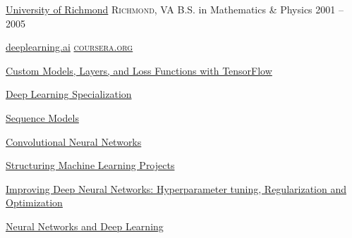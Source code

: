 \documentclass[10pt,a4paper]{article}
\begin{document}
\headedsection
  {\href{http://www.richmond.edu/}{University of Richmond}}
  {\textsc{Richmond, VA}} {%
  \headedsubsection
    {B.S. in Mathematics \& Physics}
    {2001 -- 2005}
    {}
}


\spacedhrule{2.0em}{0.2em}



  \headedsection
    {\href{https://www.deeplearning.ai/}{deeplearning.ai}}
    {\href{https://www.coursera.org/}{\textsc{coursera.org}}} {

      \headedsubsection
        {\href{https://www.coursera.org/account/accomplishments/verify/TWG6QF3MVDHG}{Custom Models, Layers, and Loss Functions with TensorFlow}}
        {}

      \headedsubsection
        {\href{https://www.coursera.org/account/accomplishments/specialization/9WCEB5PYL6VT}{Deep Learning Specialization}}
        {}

      \headedsubsection
        {\href{https://www.coursera.org/account/accomplishments/verify/RE53JG7A9ZKV}{Sequence Models}}
        {}

      \headedsubsection
        {\href{https://www.coursera.org/account/accomplishments/verify/GNUR9KQXTNPS}{Convolutional Neural Networks}}
        {}

      \headedsubsection
        {\href{https://www.coursera.org/account/accomplishments/verify/UXZBYZQKAEU9}{Structuring Machine Learning Projects}}
        {}

      \headedsubsection
        {\href{https://www.coursera.org/account/accomplishments/verify/8FCH622WF97A}{Improving Deep Neural Networks: Hyperparameter tuning, Regularization and Optimization}}
        {}

      \headedsubsection
        {\href{https://www.coursera.org/account/accomplishments/verify/JSDREA8QF6XG}{Neural Networks and Deep Learning}}
        {}

    }


\spacedhrule{2.0em}{0.2em}

\end{document}
